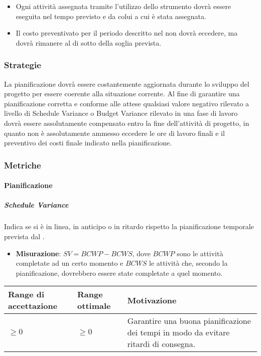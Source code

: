 \begin{itemize}
\item Ogni attività assegnata tramite l'utilizzo dello strumento  dovrà essere eseguita nel tempo previsto e da colui a cui è stata assegnata.
\item Il costo preventivato per il periodo descritto nel \PdP{} non dovrà eccedere, ma dovrà rimanere al di sotto della soglia prevista.
\end{itemize}

\subsubsection{Strategie}
La pianificazione dovrà essere costantemente aggiornata durante lo sviluppo del progetto per essere coerente alla situazione corrente. Al fine di garantire una pianificazione corretta e conforme alle attese qualsiasi valore negativo rilevato a livello di Schedule Variance o Budget Variance rilevato in una fase di lavoro dovrà essere
assolutamente compensato entro la fine dell’attività di progetto, in quanto non è assolutamente
ammesso eccedere le ore di lavoro finali e il preventivo dei costi finale indicato nella pianificazione.

\subsubsection{Metriche}

\paragraph{Pianificazione}

\subparagraph{Schedule Variance}
Indica se si è in linea, in anticipo o in ritardo rispetto la pianificazione temporale prevista dal \PdP.

\begin{itemize}
\item \textbf{Misurazione}: $SV = BCWP - BCWS$, dove $BCWP$ sono le attività completate ad un certo momento e $BCWS$ le attività che, secondo la pianificazione, dovrebbero essere state completate a quel momento.
\end{itemize}

\begin{center}

		\begin{tabular}{|P{2.5cm}|P{2.5cm}|P{6cm}|}
		\hline
			\textbf{Range di accettazione}	& \textbf{Range ottimale} & \textbf{Motivazione} \\
			\hline
			$\geq 0$ & $\geq 0$ & Garantire una buona pianificazione dei tempi in modo da evitare ritardi di consegna. \\
			\hline
			\end{tabular}
\end{center}


